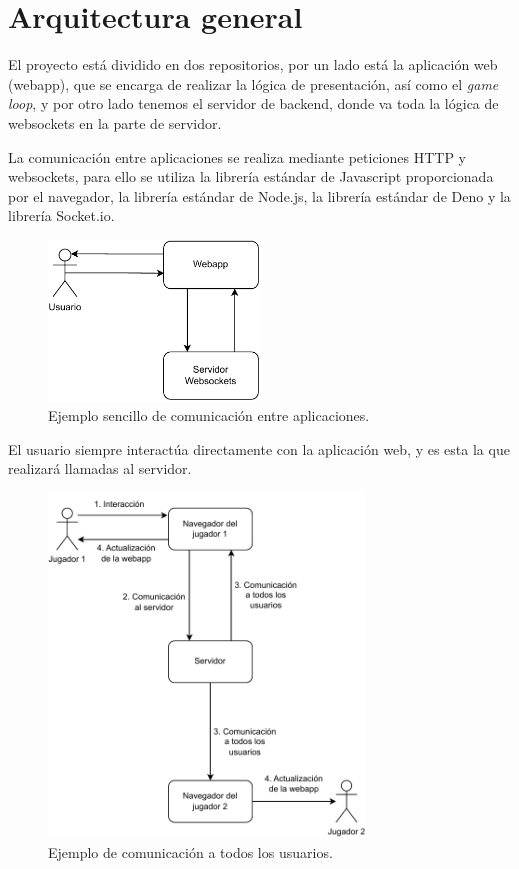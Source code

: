 \section{Arquitectura general}
El proyecto está dividido en dos repositorios, por un lado está la aplicación web (webapp), que se encarga de realizar la lógica de presentación, así como el \textit{game loop}, y por otro lado tenemos el servidor de backend, donde va toda la lógica de websockets en la parte de servidor.

La comunicación entre aplicaciones se realiza mediante peticiones HTTP y websockets, para ello se utiliza la librería estándar de Javascript proporcionada por el navegador, la librería estándar de Node.js, la librería estándar de Deno y la librería Socket.io.

\begin{figure}[H]
	\centering
	\includegraphics[clip=true,width=0.5\textwidth]{./diagrams/general_arch.pdf}
	\caption{Ejemplo sencillo de comunicación entre aplicaciones.}
	\label{fig:ex_app_comms}
\end{figure}

El usuario siempre interactúa directamente con la aplicación web, y es esta la que realizará llamadas al servidor.

\begin{figure}[H]
	\centering
	\includegraphics[clip=true,width=0.75\textwidth]{./diagrams/overall_communications.pdf}
	\caption{Ejemplo de comunicación a todos los usuarios.}
	\label{fig:ex_comms}
\end{figure}

